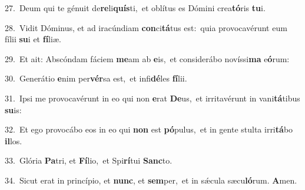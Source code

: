{\numbfont\textcolor{\numbcolor}{27.}}~Deum qui te génuit de\-\textbf{re}\-li\-\textbf{quís}\-ti,~\star et oblítus es Dómini crea\-\textbf{tó}\-ris \textbf{tu}\-i.\par
{\numbfont\textcolor{\numbcolor}{28.}}~Vidit Dóminus, et ad iracúndiam \textbf{con}\-ci\-\textbf{tá}\-tus est:~\star quia provocavérunt eum fílii \textbf{su}\-i et \textbf{fí}\-liæ.\par
{\numbfont\textcolor{\numbcolor}{29.}}~Et ait: Abscóndam fáciem \textbf{me}\-am ab \textbf{e}\-is,~\star et considerábo novíssi\textbf{ma} e\-\textbf{ó}\-rum:\par
{\numbfont\textcolor{\numbcolor}{30.}}~Generátio \textbf{e}\-nim per\-\textbf{vér}\-sa est,~\star et infi\-\textbf{dé}\-les \textbf{fí}\-lii.\par
{\numbfont\textcolor{\numbcolor}{31.}}~Ipsi me provocavérunt in eo qui non \textbf{e}\-rat \textbf{De}\-us,~\star et irritavérunt in vani\-\textbf{tá}\-tibus \textbf{su}\-is:\par
{\numbfont\textcolor{\numbcolor}{32.}}~Et ego provocábo eos in eo qui \textbf{non} est \textbf{pó}\-pulus,~\star et in gente stulta irri\-\textbf{tá}\-bo \textbf{il}\-los.\par
{\numbfont\textcolor{\numbcolor}{33.}}~Glória \textbf{Pa}\-tri, et \textbf{Fí}\-lio,~\star et Spi\-\textbf{rí}\-tui \textbf{Sanc}\-to.\par
{\numbfont\textcolor{\numbcolor}{34.}}~Sicut erat in princípio, et \textbf{nunc}\-, et \textbf{sem}\-per,~\star et in sǽcula sæcu\-\textbf{ló}\-rum. \textbf{A}\-men.\par
